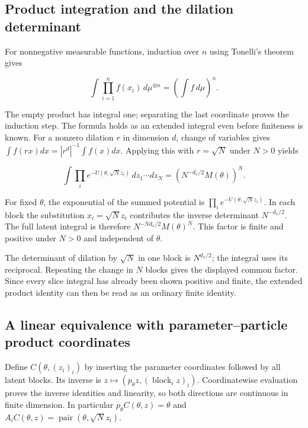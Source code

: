 \documentclass[11pt,a4paper]{article}
\begin{document}
\subsection{\texorpdfstring{Product integration and the dilation determinant}{Product integration and the dilation determinant}}


For nonnegative measurable functions, induction over \(n\) using Tonelli’s theorem gives

\[\int\prod_{i=1}^nf(x_i)\,d\mu^{\otimes n}=\left(\int f\,d\mu\right)^n.\]

The empty product has integral one; separating the last coordinate proves the induction step. The formula holds as an extended integral even before finiteness is known. For a nonzero dilation \(r\) in dimension \(d\), change of variables gives \(\int f(rx)dx=|r^d|^{-1}\int f(x)dx\). Applying this with \(r=\sqrt N\) under \(N>0\) yields

\[\int\prod_i e^{-U(\theta,\sqrt N z_i)}\,dz_1\cdots dz_N=\left(N^{-d_x/2}M(\theta)\right)^N.\]

For fixed \(\theta\), the exponential of the summed potential is \(\prod_i e^{-U(\theta,\sqrt N z_i)}\). In each block the substitution \(x_i=\sqrt N z_i\) contributes the inverse determinant \(N^{-d_x/2}\). The full latent integral is therefore \(N^{-Nd_x/2}M(\theta)^N\). This factor is finite and positive under \(N>0\) and independent of \(\theta\).



The determinant of dilation by \(\sqrt N\) in one block is \(N^{d_x/2}\); the integral uses its reciprocal. Repeating the change in \(N\) blocks gives the displayed common factor. Since every slice integral has already been shown positive and finite, the extended product identity can then be read as an ordinary finite identity.



\subsection{\texorpdfstring{A linear equivalence with parameter–particle product coordinates}{A linear equivalence with parameter–particle product coordinates}}


Define \(C(\theta,(z_i)_i)\) by inserting the parameter coordinates followed by all latent blocks. Its inverse is \(z\mapsto(p_\theta z,(\operatorname{block}_iz)_i)\). Coordinatewise evaluation proves the inverse identities and linearity, so both directions are continuous in finite dimension. In particular \(p_\theta C(\theta,z)=\theta\) and \(A_iC(\theta,z)=\operatorname{pair}(\theta,\sqrt N z_i)\).
\end{document}
